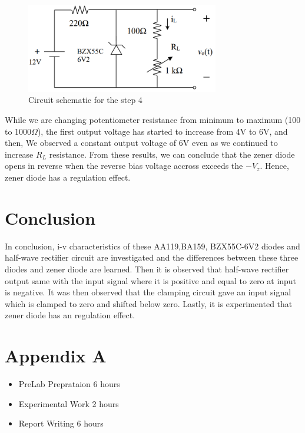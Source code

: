 \documentclass[letterpaper,12pt]{article}
\begin{document}
\begin{figure}[H]
    \centering
    \includegraphics[width = 0.75\textwidth]{4_1.png}
    \caption{Circuit schematic for the step 4}
\end{figure} 
    
While we are changing potentiometer resistance from minimum to maximum (100 to 1000\(\Omega\)), the first output voltage has started to increase from 4V to 6V, and then, We observed a constant output voltage of 6V even as we continued to increase \(R_L\) resistance. From these results, we can conclude that the zener diode opens in reverse when the reverse bias voltage accross exceeds the \(-V_z\). Hence, zener diode has a regulation effect.
    
\section{Conclusion}

In conclusion, i-v characteristics of these AA119,BA159, BZX55C-6V2 diodes and half-wave rectifier circuit are investigated and the differences between these three diodes and zener diode are learned. Then it is observed that half-wave rectifier output same with the input signal where it is positive and equal to zero at input is negative. It was then observed that the clamping circuit gave an input signal which is clamped to zero and shifted below zero. Lastly, it is experimented that zener diode has an regulation effect. 



\section*{Appendix A}
\begin{itemize}
    \item PreLab Preprataion 6 hours
    \item Experimental Work 2  hours
    \item Report Writing 6 hours
\end{itemize}
\end{document}
